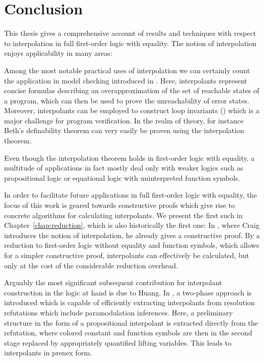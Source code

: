 \chapter{Conclusion}

This thesis gives a comprehensive account of results and techniques with respect to interpolation in full first-order logic with equality.
The notion of interpolation enjoys applicability in many areas:

Among the most notable practical uses of interpolation we can certainly count the application in model checking introduced in \cite{McMillan03}.
Here, interpolants represent concise formulas describing an overapproximation of the set of reachable states of a program, which can then be used to prove the unreachability of error states.
Moreover, interpolants can be employed to construct loop invariants (\cite{weissenbacher2010}) which is a major challenge for program verification.
In the realm of theory, for instance Beth's definability theorem can very easily be proven using the interpolation theorem.

Even though the interpolation theorem holds in first-order logic with equality, %
a multitude of applications in fact mostly deal only with weaker logics such as propositional logic or equational logic with uninterpreted function symbols.

In order to facilitate future applications in full first-order logic with equality, the focus of this work is geared towards constructive proofs which give rise to concrete algorithms for calculating interpolants.
We present the first such in Chapter~\ref{chap:reduction}, which is also historically the first one:
In \cite{Craig57linear,Craig57three}, where Craig introduces the notion of interpolation, he already gives a constructive proof.
By a reduction to first-order logic without equality and function symbols, which allows for a simpler constructive proof, interpolants can effectively be calculated, but only at the cost of the considerable reduction overhead.

Arguably the most significant subsequent contribution for interpolant construction in the logic at hand is due to Huang.
In \cite{Huang95}, a two-phase approach is introduced which is capable of efficiently extracting interpolants from resolution refutations which include paramodulation inferences.
Here, a preliminary structure in the form of a propositional interpolant is extracted directly from the refutation, where colored constant and function symbols are then in the second stage replaced by appropriately quantified lifting variables.
This leads to interpolants in prenex form.


